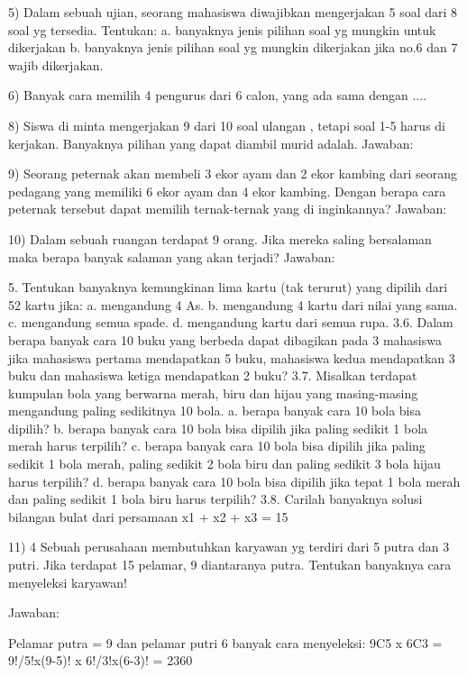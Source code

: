 \documentclass[11pt,fleqn]{book} %
\begin{document}
{5) Dalam sebuah ujian, seorang mahasiswa diwajibkan mengerjakan 5 soal dari 8 soal yg tersedia. Tentukan:
a. banyaknya jenis pilihan soal yg mungkin untuk dikerjakan
b. banyaknya jenis pilihan soal yg mungkin dikerjakan jika no.6 dan 7 wajib dikerjakan.

6) Banyak cara memilih 4 pengurus dari 6 calon, yang ada sama dengan ....


8) Siswa di minta mengerjakan 9 dari 10 soal ulangan , tetapi soal 1-5 harus di kerjakan. Banyaknya pilihan yang dapat diambil murid adalah.
Jawaban:



9) Seorang peternak akan membeli 3 ekor ayam dan 2 ekor kambing dari seorang pedagang yang memiliki 6 ekor ayam dan 4 ekor kambing. Dengan berapa cara peternak tersebut dapat memilih ternak-ternak yang di inginkannya?
Jawaban:



10) Dalam sebuah ruangan terdapat 9 orang. Jika mereka saling bersalaman maka berapa banyak salaman yang akan terjadi?
Jawaban:

5. Tentukan banyaknya kemungkinan lima kartu (tak terurut) yang dipilih
dari 52 kartu jika:
a. mengandung 4 As.
b. mengandung 4 kartu dari nilai yang sama.
c. mengandung semua spade.
d. mengandung kartu dari semua rupa.
3.6. Dalam berapa banyak cara 10 buku yang berbeda dapat dibagikan
pada 3 mahasiswa jika mahasiswa pertama mendapatkan 5 buku, mahasiswa
kedua mendapatkan 3 buku dan mahasiswa ketiga mendapatkan
2 buku?
3.7. Misalkan terdapat kumpulan bola yang berwarna merah, biru dan hijau
yang masing-masing mengandung paling sedikitnya 10 bola.
a. berapa banyak cara 10 bola bisa dipilih?
b. berapa banyak cara 10 bola bisa dipilih jika paling sedikit 1 bola
merah harus terpilih?
c. berapa banyak cara 10 bola bisa dipilih jika paling sedikit 1 bola
merah, paling sedikit 2 bola biru dan paling sedikit 3 bola hijau
harus terpilih?
d. berapa banyak cara 10 bola bisa dipilih jika tepat 1 bola merah
dan paling sedikit 1 bola biru harus terpilih?
3.8. Carilah banyaknya solusi bilangan bulat dari persamaan
x1 + x2 + x3 = 15




 11) 4 Sebuah perusahaan membutuhkan karyawan yg terdiri dari 5 putra dan 3 putri. Jika terdapat 15 pelamar, 9 diantaranya putra. Tentukan banyaknya cara menyeleksi karyawan!
 
 
Jawaban:


Pelamar putra = 9 dan pelamar putri 6 banyak cara menyeleksi:
9C5 x 6C3 = 9!/5!x(9-5)! x 6!/3!x(6-3)! = 2360


}
\end{document}
